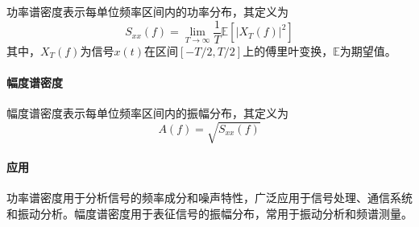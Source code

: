 \documentclass[dvipsnames, svgnames,a4paper,11pt]{article}
\begin{document}
功率谱密度表示每单位频率区间内的功率分布，其定义为
\[ S_{xx}(f) = \lim_{T \to \infty} \frac{1}{T} \mathbb{E} \left[ \left| X_T(f) \right|^2 \right] \]
其中，$X_T(f)$为信号$x(t)$在区间$[-T/2, T/2]$上的傅里叶变换，$\mathbb{E}$为期望值。

\paragraph*{幅度谱密度}

幅度谱密度表示每单位频率区间内的振幅分布，其定义为
\[ A(f) = \sqrt{S_{xx}(f)} \]

\paragraph*{应用}

功率谱密度用于分析信号的频率成分和噪声特性，广泛应用于信号处理、通信系统和振动分析。幅度谱密度用于表征信号的振幅分布，常用于振动分析和频谱测量。










			


		
\end{document}
